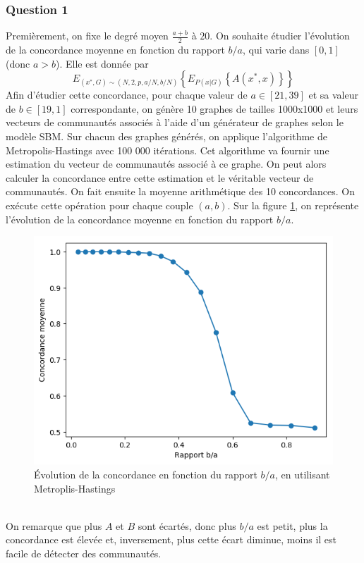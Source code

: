 \documentclass[a4paper, 11pt]{article}
\begin{document}
\subsubsection{Question 1}\label{221}
Premièrement, on fixe le degré moyen $\frac{a+b}{2}$ à $20$. On souhaite étudier l'évolution de la concordance moyenne en fonction du rapport $b/a$, qui varie dans $[0,1]$ (donc $a>b$). Elle est donnée par
\begin{equation}
    E_{(x^*,G)\sim (N,2,p,a/N,b/N)}\left\{ E_{P(x|G)} \left\{A(x^*,x) \right\} \right\}
\end{equation}
Afin d'étudier cette concordance, pour chaque valeur de $a \in [21,39]$ et sa valeur de $b \in [19,1]$ correspondante, on génère 10 graphes de tailles 1000x1000 et leurs vecteurs de communautés associés à l'aide d'un générateur de graphes selon le modèle SBM. Sur chacun des graphes générés, on applique l'algorithme de Metropolis-Hastings avec 100 000 itérations. Cet algorithme va fournir une estimation du vecteur de communautés associé à ce graphe. On peut alors calculer la concordance entre cette estimation et le véritable vecteur de communautés. On fait ensuite la moyenne arithmétique des 10 concordances. On exécute cette  opération pour chaque couple $(a,b)$. Sur la figure \ref{conco}, on représente l'évolution de la concordance moyenne en fonction du rapport $b/a$. 
\begin{figure}[h!]
    \centering
    \includegraphics[scale=0.85]{evol_mean_concordance.png}
    \caption{Évolution de la concordance en fonction du rapport $b/a$, en utilisant Metroplis-Hastings}
    \label{conco}
\end{figure}\\
On remarque que plus $A$ et $B$ sont écartés, donc plus $b/a$ est petit, plus la concordance est élevée et, inversement, plus cette écart diminue, moins il est facile de détecter des communautés.\\
\end{document}
